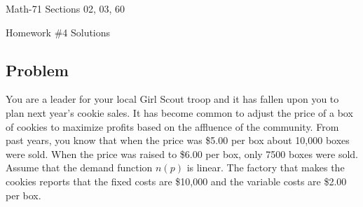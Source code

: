 \documentclass[letterpaper,12pt,fleqn]{article}
\begin{document}
\begin{center}
  \large
  Math-71 Sections 02, 03, 60

  \Large
  Homework \#4 Solutions
\end{center}

\subsection*{Problem}

You are a leader for your local Girl Scout troop and it has fallen upon you to plan next year's cookie sales.  It
has become common to adjust the price of a box of cookies to maximize profits based on the affluence of the
community.  From past years, you know that when the price was \$5.00 per box about 10,000 boxes were sold.  When
the price was raised to \$6.00 per box, only 7500 boxes were sold.  Assume that the demand function \(n(p)\) is
linear.  The factory that makes the cookies reports that the fixed costs are \$10,000 and the variable costs are
\$2.00 per box.
\end{document}

